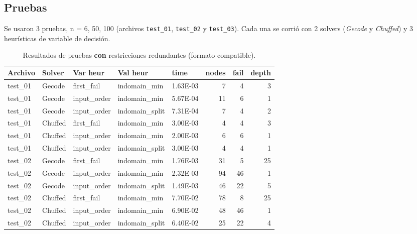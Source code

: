 
\subsection{Pruebas}\label{sec:03-secuencia-magica-pruebas}
Se usaron 3 pruebas, n = {6, 50, 100} (archivos \texttt{test\_01}, \texttt{test\_02} y \texttt{test\_03}). Cada una se corrió con 2 solvers (\textit{Gecode} y \textit{Chuffed}) y 3 heurísticas de variable de decisión.

\begin{compactfloats}
\begin{table}[H]
  \centering
  \small
  \setlength{\tabcolsep}{10.8pt}
  \caption{Resultados de pruebas \textbf{con} restricciones redundantes (formato compatible).}
  \label{tab:pruebas-secuencia}
  \begin{tabular}{l l l l l r r r}
    \toprule
    \textbf{Archivo} & \textbf{Solver} & \textbf{Var heur} & \textbf{Val heur} & \textbf{time} & \textbf{nodes} & \textbf{fail} & \textbf{depth} \\
    \midrule
    test\_01 & Gecode  & first\_fail  & indomain\_min   & 1.63E-03 & 7   & 4   & 3  \\
    test\_01 & Gecode  & input\_order & indomain\_min   & 5.67E-04 & 11  & 6   & 1  \\
    test\_01 & Gecode  & input\_order & indomain\_split & 7.31E-04 & 7   & 4   & 2  \\
    test\_01 & Chuffed & first\_fail  & indomain\_min   & 3.00E-03 & 4   & 4   & 3  \\
    test\_01 & Chuffed & input\_order & indomain\_min   & 2.00E-03 & 6   & 6   & 1  \\
    test\_01 & Chuffed & input\_order & indomain\_split & 3.00E-03 & 4   & 4   & 1  \\
    \midrule
    test\_02 & Gecode  & first\_fail  & indomain\_min   & 1.76E-03 & 31  & 5   & 25 \\
    test\_02 & Gecode  & input\_order & indomain\_min   & 2.32E-03 & 94  & 46  & 1  \\
    test\_02 & Gecode  & input\_order & indomain\_split & 1.49E-03 & 46  & 22  & 5  \\
    test\_02 & Chuffed & first\_fail  & indomain\_min   & 7.70E-02 & 78  & 8   & 25 \\
    test\_02 & Chuffed & input\_order & indomain\_min   & 6.90E-02 & 48  & 46  & 1  \\
    test\_02 & Chuffed & input\_order & indomain\_split & 6.40E-02 & 25  & 22  & 4  \\

\end{tabular}
\end{table}
\end{compactfloats}
